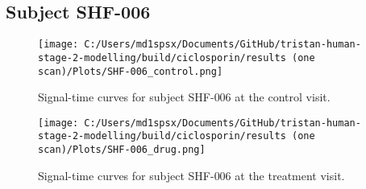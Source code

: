 \documentclass{epflreport}%
\begin{document}
\subsection{Subject SHF{-}006}%
\label{subsec:SubjectSHF{-}006}%

%


\begin{figure}[h!]%
\centering%
\texttt{[image: C:/Users/md1spsx/Documents/GitHub/tristan-human-stage-2-modelling/build/ciclosporin/results (one scan)/Plots/SHF-006\_control.png]}%
\caption{Signal{-}time curves for subject SHF{-}006 at the control visit.}%
\end{figure}

%


\begin{figure}[h!]%
\centering%
\texttt{[image: C:/Users/md1spsx/Documents/GitHub/tristan-human-stage-2-modelling/build/ciclosporin/results (one scan)/Plots/SHF-006\_drug.png]}%
\caption{Signal{-}time curves for subject SHF{-}006 at the treatment visit.}%
\end{figure}
\end{document}
